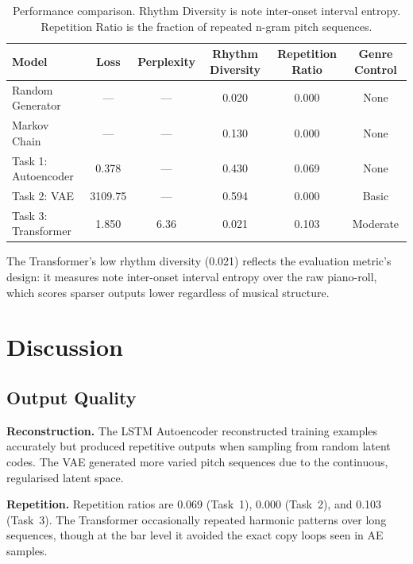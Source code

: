 \documentclass{article} %
\begin{document}
\begin{table}[h]
\centering
\caption{Performance comparison. Rhythm Diversity is note inter-onset interval entropy. Repetition Ratio is the fraction of repeated n-gram pitch sequences.}
\label{tab:master}
\setlength{\tabcolsep}{5pt}
\begin{tabular}{lccccc}
\toprule
\textbf{Model} & \textbf{Loss} & \textbf{Perplexity} & \textbf{Rhythm Diversity} & \textbf{Repetition Ratio} & \textbf{Genre Control} \\
\midrule
Random Generator    & ---     & ---    & 0.020 & 0.000 & None \\
Markov Chain        & ---     & ---    & 0.130 & 0.000 & None \\
Task 1: Autoencoder & 0.378   & ---    & 0.430 & 0.069 & None \\
Task 2: VAE         & 3109.75 & ---    & 0.594 & 0.000 & Basic \\
Task 3: Transformer & 1.850   & 6.36   & 0.021 & 0.103 & Moderate \\
\bottomrule
\end{tabular}
\end{table}

The Transformer's low rhythm diversity (0.021) reflects the evaluation metric's design: it measures note inter-onset interval entropy over the raw piano-roll, which scores sparser outputs lower regardless of musical structure.

\section{Discussion}

\subsection{Output Quality}

\textbf{Reconstruction.}
The LSTM Autoencoder reconstructed training examples accurately but produced repetitive outputs when sampling from random latent codes. The VAE generated more varied pitch sequences due to the continuous, regularised latent space.

\textbf{Repetition.}
Repetition ratios are 0.069 (Task~1), 0.000 (Task~2), and 0.103 (Task~3). The Transformer occasionally repeated harmonic patterns over long sequences, though at the bar level it avoided the exact copy loops seen in AE samples.
\end{document}
